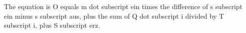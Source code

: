 The equation is O equals m dot subscript ein times the difference of s subscript ein minus s subscript aus, plus the sum of Q dot subscript i divided by T subscript i, plus S subscript erz.